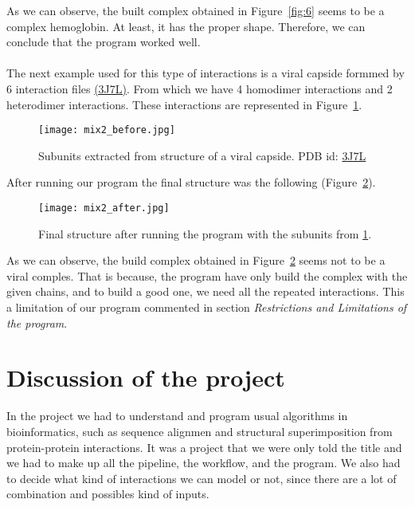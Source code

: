 \documentclass[a4paper,10pt]{report}
\begin{document}
\newpage

\noindent
As we can observe, the built complex obtained in Figure~\ref{fig:6} seems to be a complex hemoglobin. At least, it has the proper shape. Therefore, we can conclude that the program worked well.\\\\

\noindent
The next example used for this type of interactions is a viral capside formmed by 6 interaction files \href{https://www.rcsb.org/structure/3j7l}{(3J7L)}. From which we have 4 homodimer interactions and 2 heterodimer interactions. These interactions are represented in Figure~\ref{fig:7}.\\

\begin{figure}[h]
\texttt{[image: mix2\_before.jpg]}
\centering
\caption{Subunits extracted from structure of a viral capside. PDB id: \href{https://www.rcsb.org/structure/3j7l}{3J7L}}
\label{fig:7}
\end{figure}

\noindent
After running our program the final structure was the following (Figure~\ref{fig:8}).\\

\begin{figure}[h]
\centering
\texttt{[image: mix2\_after.jpg]}
\caption{Final structure after running the program with the subunits from \ref{fig:7}.}
\label{fig:8}
\end{figure}

\noindent
As we can observe, the build complex obtained in Figure~\ref{fig:8} seems not to be a viral comples. That is because, the program have only build the complex with the given chains, and to build a good one, we need all the repeated interactions. This a limitation of our program commented in section \textit{Restrictions and Limitations of the program}.\\


\chapter{Discussion of the project}

In the project we had to understand and program usual algorithms in bioinformatics, such as sequence alignmen and structural superimposition from protein-protein interactions. It was a project that we were only told the title and we had to make up all the pipeline, the workflow, and the program. We also had to decide what kind of interactions we can model or not, since there are a lot of combination and possibles kind of inputs.
\end{document}
